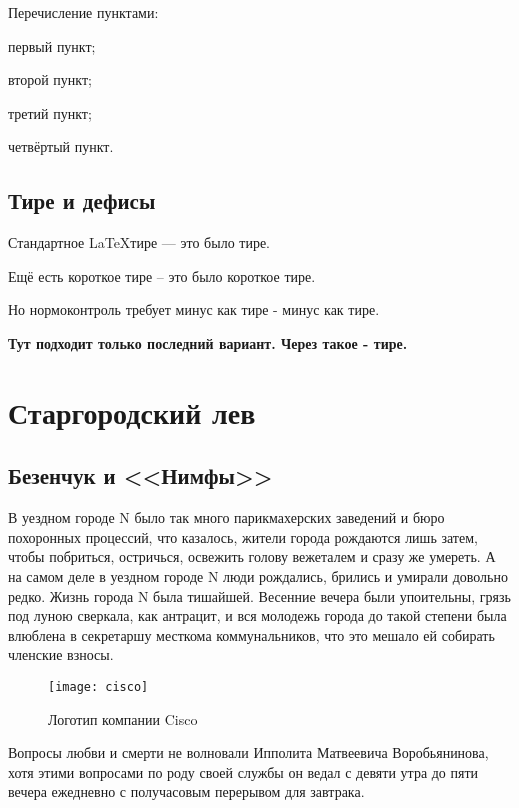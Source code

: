 Перечисление пунктами:
\begin{itemizePaper}
    \item первый пункт;
    \item второй пункт;
    \item третий пункт;
    \item четвёртый пункт.
\end{itemizePaper}

\section{Тире и дефисы}\label{sec:chapter_1/section_6}

Стандартное \LaTeX тире --- это было тире.

Ещё есть короткое тире -- это было короткое тире.

Но нормоконтроль требует минус как тире - минус как тире.

\textbf{Тут подходит только последний вариант. Через такое - тире.}


\chapter{Старгородский лев}
\section{Безенчук и <<Нимфы>>}

В уездном городе N было так много парикмахерских заведений и бюро похоронных процессий, что казалось,
жители города рождаются лишь затем, чтобы побриться, остричься, освежить голову вежеталем и сразу же умереть.
А на самом деле в уездном городе N люди рождались, брились и умирали довольно редко. Жизнь города N была тишайшей.
Весенние вечера были упоительны, грязь под луною сверкала, как антрацит, и вся молодежь города до такой степени была влюблена
в секретаршу месткома коммунальников, что это мешало ей собирать членские взносы.

\begin{figure}[ht]
    \centerfloat
    {
        \texttt{[image: cisco]}
    }
    \caption{Логотип компании Cisco}\label{fig:cisco}
\end{figure}

Вопросы любви и смерти не волновали Ипполита Матвеевича Воробьянинова, хотя этими вопросами по роду своей службы он ведал с
девяти утра до пяти вечера ежедневно с получасовым перерывом для завтрака.

